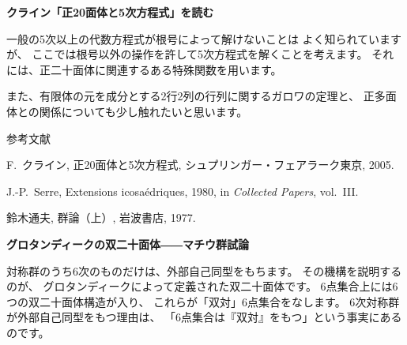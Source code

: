 \documentclass[uplatex,dvipdfmx]{jlreq}
\begin{document}
\vfill

\newpage

\begin{center}
{\large\bfseries クライン「正20面体と5次方程式」を読む}\\[6pt]
\hspace*{\fill}{\large\bfseries 橋本 義武（阪市大・理）}
\end{center}

一般の5次以上の代数方程式が根号によって解けないことは
よく知られていますが、
ここでは根号以外の操作を許して5次方程式を解くことを考えます。
それには、正二十面体に関連するある特殊関数を用います。

また、有限体の元を成分とする2行2列の行列に関するガロワの定理と、
正多面体との関係についても少し触れたいと思います。

\begin{center}\textsc{参考文献}\end{center}
\begin{enumerate}[{[1]}]
  \item F.~クライン, 正20面体と5次方程式, シュプリンガー・フェアラーク東京, 2005.
  \item J.-P.~Serre, Extensions icosaédriques, 1980, in \textit{Collected Papers}, vol.~III.
  \item 鈴木通夫, 群論（上）, 岩波書店, 1977.
\end{enumerate}

\vfill

\newpage

\begin{center}
{\large\bfseries グロタンディークの双二十面体――マチウ群試論}\\[6pt]
\hspace*{\fill}{\large\bfseries 橋本 義武（阪市大・理）}
\end{center}

対称群のうち6次のものだけは、外部自己同型をもちます。
その機構を説明するのが、
グロタンディークによって定義された双二十面体です。
6点集合上には6つの双二十面体構造が入り、
これらが「双対」6点集合をなします。
6次対称群が外部自己同型をもつ理由は、
「6点集合は『双対』をもつ」という事実にあるのです。
\end{document}
